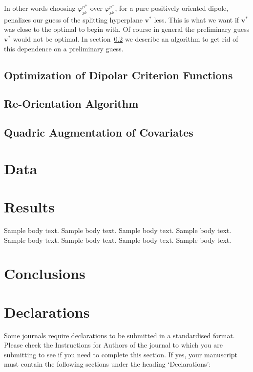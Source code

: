 \documentclass[sn-mathphys]{sn-jnl}%
\theoremstyle{thmstyleone}%
\theoremstyle{thmstyletwo}%
\theoremstyle{thmstylethree}%
\begin{document}
In other words choosing $\varphi^{p^+}_{jk}$ over $\varphi^{p^-}_{jk}$, for a pure positively oriented dipole, penalizes our guess of the splitting hyperplane $\mathbf{v}^{\ast}$ less. This is what we want if $\mathbf{v}^{\ast}$ was close to the optimal to begin with. Of course in general the preliminary guess $\mathbf{v}^{\ast}$ would not be optimal. In section~\ref{sec:ROA} we describe an algorithm to get rid of this dependence on a preliminary guess.


\subsection{Optimization of Dipolar Criterion Functions} 

\subsection{Re-Orientation Algorithm} \label{sec:ROA}

\subsection{Quadric Augmentation of Covariates}

\section{Data}



\section{Results}\label{sec2}

Sample body text. Sample body text. Sample body text. Sample body text. Sample body text. Sample body text. Sample body text. Sample body text.

\section{Conclusions} 

\section*{Declarations}

Some journals require declarations to be submitted in a standardised format. Please check the Instructions for Authors of the journal to which you are submitting to see if you need to complete this section. If yes, your manuscript must contain the following sections under the heading `Declarations':
\end{document}
